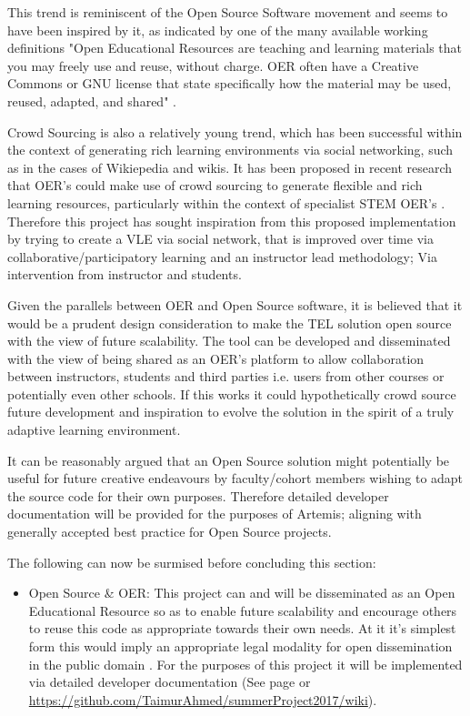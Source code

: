 \begin{itemize}[\null]
    This trend is reminiscent of the Open Source Software movement and seems to have been inspired by it, as indicated by one of the many available working definitions "Open Educational Resources are teaching and learning materials that you may freely use and reuse, without charge. OER often have a Creative Commons or GNU license that state specifically how the material may be used, reused, adapted, and shared" \cite{CreativeCommons}.
    
    Crowd Sourcing is also a relatively young trend, which has been successful within the context of generating rich learning environments via social networking, such as in the cases of Wikiepedia and wikis. It has been proposed in recent research that OER's could make use of crowd sourcing to generate flexible and rich learning resources, particularly within the context of specialist STEM OER's \cite{Hills2015,Estelles-Arolas2012}. Therefore this project has sought inspiration from this proposed implementation by trying to create a VLE via social network, that is improved over time via collaborative/participatory learning and an instructor lead methodology; Via intervention from instructor and students.
    
    Given the parallels between  OER and Open Source software, it is believed that it would be a prudent design consideration to make the TEL solution open source with the view of future scalability. The tool can be developed and disseminated with the view of being shared as an OER's platform to allow collaboration between instructors, students and third parties i.e. users from other courses or potentially even other schools. If this works it could hypothetically crowd source future development and inspiration to evolve the solution in the spirit of a truly adaptive learning environment.
    
    It can be reasonably argued that an Open Source solution might potentially be useful for future creative endeavours by faculty/cohort members wishing to adapt the source code for their own purposes. Therefore detailed developer documentation will be provided for the purposes of Artemis; aligning with generally accepted best practice for Open Source projects.
    
    
    The following can now be surmised before concluding this section:
    \begin{itemize}
        \item Open Source \& OER: This project can and  will be disseminated as an Open Educational Resource so as to enable future scalability and encourage others to reuse this code as appropriate towards their own needs. At it it's simplest form this would imply an appropriate legal modality for open dissemination in the public domain \cite{UNESCO}. For the purposes of this project it will be implemented via detailed developer documentation (See page \textbf{ \pageref{devDocPage}} or \url{https://github.com/TaimurAhmed/summerProject2017/wiki}).
        

\end{itemize}
\end{itemize}
